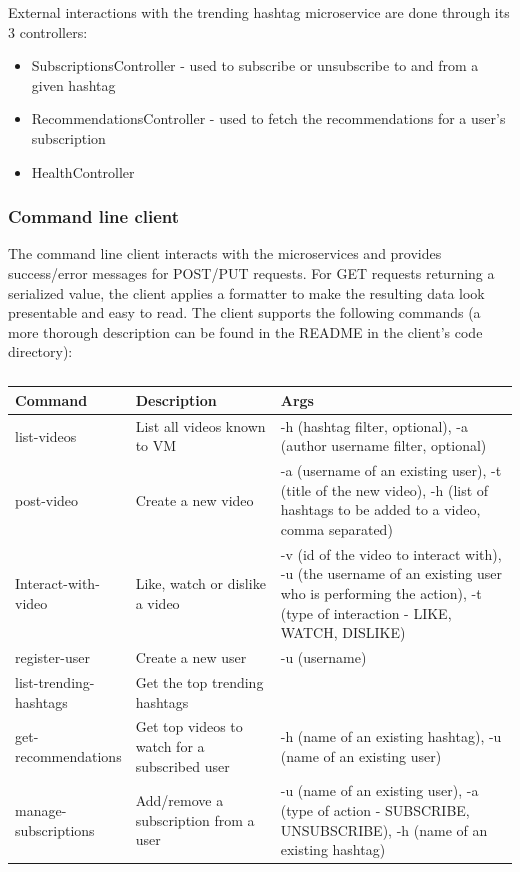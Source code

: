 \documentclass[parskip=full]{article}
\begin{document}
    External interactions with the trending hashtag microservice are done through its 3 controllers:

    \begin{itemize}
        \item SubscriptionsController - used to subscribe or unsubscribe to and from a given hashtag
        \item RecommendationsController - used to fetch the recommendations for a user's subscription
        \item HealthController
    \end{itemize}

    \subsubsection{Command line client}
    The command line client interacts with the microservices and provides success/error messages for POST/PUT requests.
    For GET requests returning a serialized value, the client applies a formatter to make the resulting data look presentable and easy to read.
    The client supports the following commands (a more thorough description can be found in the README in the client's code directory):

    \begin{table}
        \centering
        \begin{tabular}{|p{0.2\linewidth}|p{0.3\linewidth}|p{0.5\linewidth}|}
            \toprule
            \textbf{Command} & \textbf{Description} & \textbf{Args} \\
            \midrule
            list-videos & List all videos known to VM & -h (hashtag filter, optional), -a (author username filter, optional) \\
            post-video & Create a new video & -a (username of an existing user), -t (title of the new video), -h (list of hashtags to be added to a video, comma separated) \\
            Interact-with-video & Like, watch or dislike a video & -v (id of the video to interact with), -u (the username of an existing user who is performing the action), -t (type of interaction - LIKE, WATCH, DISLIKE) \\
            register-user & Create a new user & -u (username) \\
            list-trending-hashtags & Get the top trending hashtags &  \\
            get-recommendations & Get top videos to watch for a subscribed user & -h (name of an existing hashtag), -u (name of an existing user) \\
            manage-subscriptions & Add/remove a subscription from a user & -u (name of an existing user), -a (type of action - SUBSCRIBE, UNSUBSCRIBE), -h (name of an existing hashtag) \\
            \bottomrule
        \end{tabular}
        \caption{}
        \label{tab:cli-commands}
    \end{table}
\end{document}

